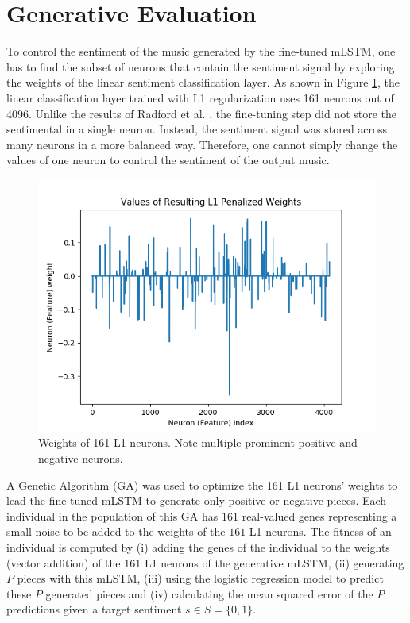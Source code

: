 \section{Generative Evaluation}

To control the sentiment of the music generated by the fine-tuned mLSTM, one has to find the subset of neurons that contain the sentiment signal by exploring the weights of the linear sentiment classification layer. As shown in Figure \ref{fig:final_weights}, the linear classification layer trained with L1 regularization uses 161 neurons out of 4096. Unlike the results of Radford et al. \cite{radford_2017}, the fine-tuning step did not store the sentimental in a single neuron. Instead, the sentiment signal was stored across many neurons in a more balanced way. Therefore, one cannot simply change the values of one neuron to control the sentiment of the output music.

\begin{figure}[!h]
 \centering
 \includegraphics[width=\columnwidth]{imgs/ismir19/weights.png}
 \caption{Weights of 161 L1 neurons. Note multiple prominent positive and negative neurons.}
 \label{fig:final_weights}
\end{figure}

A Genetic Algorithm (GA) was used to optimize the 161 L1 neurons' weights to lead the fine-tuned mLSTM to generate only positive or negative pieces. Each individual in the population of this GA has $161$ real-valued genes representing a small noise to be added to the weights of the $161$ L1 neurons. The fitness of an individual is computed by (i) adding the genes of the individual to the weights (vector addition) of the $161$ L1 neurons of the generative mLSTM, (ii) generating $P$ pieces with this mLSTM, (iii) using the logistic regression model to predict these $P$ generated pieces and (iv) calculating the mean squared error of the $P$ predictions given a target sentiment $s \in S = \{0, 1\}$.

